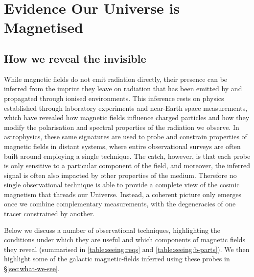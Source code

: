 \section{Evidence Our Universe is Magnetised}
\label{sec:magnetised-universe}

\subsection{How we reveal the invisible}
\label{sec:how-we-see}

While magnetic fields do not emit radiation directly, their presence can be inferred from the imprint they leave on radiation that has been emitted by and propagated through ionised environments. This inference rests on physics established through laboratory experiments and near-Earth space measurements, which have revealed how magnetic fields influence charged particles and how they modify the polarisation and spectral properties of the radiation we observe. In astrophysics, these same signatures are used to probe and constrain properties of magnetic fields in distant systems, where entire observational surveys are often built around employing a single technique. The catch, however, is that each probe is only sensitive to a particular component of the field, and moreover, the inferred signal is often also impacted by other properties of the medium. Therefore no single observational technique is able to provide a complete view of the cosmic magnetism that threads our Universe. Instead, a coherent picture only emerges once we combine complementary measurements, with the degeneracies of one tracer constrained by another.

Below we discuss a number of observational techniques, highlighting the conditions under which they are useful and which components of magnetic fields they reveal (summarised in \autoref{table:seeing:reqs} and \ref{table:seeing:b-parts}). We then highlight some of the galactic magnetic-fields inferred using these probes in \S\ref{sec:what-we-see}.

